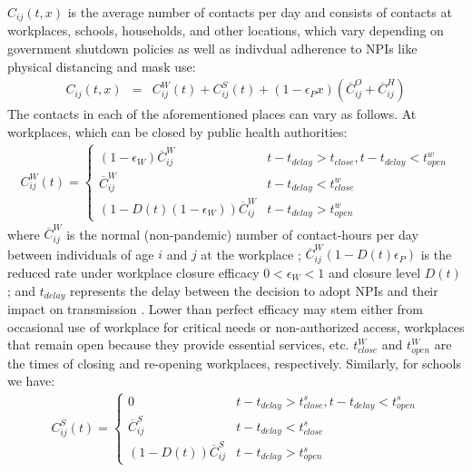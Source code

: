 $C_{ij}(t,x)$ is the average number of contacts per day and consists of contacts at workplaces, schools, households, and other locations, which vary depending on government shutdown policies as well as indivdual adherence to NPIs like physical distancing and mask use: 
\begin{eqnarray}
C_{ij}(t,x) &= & C^W_{ij}(t) + C^S_{ij}(t) + (1 - \epsilon_P x ) (\overline{C}^O_{ij} + \overline{C}^H_{ij} )
\end{eqnarray}
The contacts in each of the aforementioned places can vary as follows. At workplaces, which can be closed by public health authorities: 
\begin{eqnarray}
C^W_{ij}(t) =  \left\{
\begin{array}{ll}
      (1 - \epsilon_W) \overline{C}^W_{ij} & t - t_{delay} >t_{close}, t  - t_{delay}< t^w_{open} \\ 
      \overline{C}^W_{ij} &  t - t_{delay}<t^w_{close} \\
       
       (1 - D(t)(1 - \epsilon_W)) \overline{C}^W_{ij} & t - t_{delay}> t^w_{open}
\end{array} 
\label{cw_eqn}
\right. 
\end{eqnarray}
where $\overline{C}^W_{ij}$ is the normal (non-pandemic) number of contact-hours per day between individuals of age $i$ and $j$ at the workplace \cite{zagheni2008using}; $\overline{C}^W_{ij} (1 - D(t)\epsilon_P)$ is the reduced rate under workplace closure efficacy $0 < \epsilon_W< 1$ and closure level $D(t)$; and $t_{delay}$ represents the delay between the decision to adopt NPIs and their impact on transmission \cite{li2020temporal}. Lower than perfect efficacy may stem either from occasional use of workplace for critical needs or non-authorized access, workplaces that remain open because they provide essential services, etc. $t^W_{close}$ and $t^W_{open}$ are the times of closing and re-opening workplaces, respectively. Similarly, for schools we have: 
\begin{eqnarray}
  C^S_{ij}(t) =  \left\{
\begin{array}{ll}
      0 & t - t_{delay}>t^s_{close}, t - t_{delay} < t^s_{open} \\ 
      \overline{C}^S_{ij} &  t - t_{delay}<t^s_{close} \\
       
      (1 - D(t)) \overline{C}^S_{ij} & t - t_{delay} > t^s_{open}
\end{array} 
\right. 
\label{cs_eqn}
\end{eqnarray}
